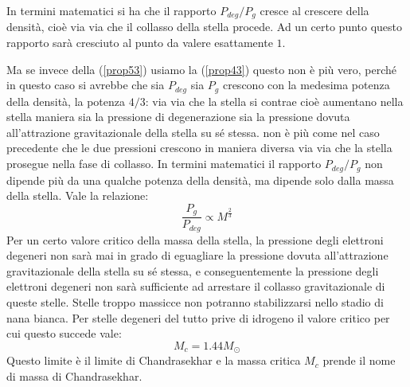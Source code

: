 In termini matematici si ha che il rapporto $P_{deg}/P_{g}$ cresce al crescere della densit\`{a}, cioè via via che il collasso della stella procede. Ad un certo punto questo rapporto sar\`{a} cresciuto al punto da valere esattamente $1$.
\par
Ma se invece della (\ref{prop53}) usiamo la (\ref{prop43}) questo non è più vero, perch\'{e} in questo caso si avrebbe che sia $P_{deg}$ sia $P_{g}$ crescono con la medesima potenza della densit\`{a}, la potenza $4/3$: via via che la stella si contrae cioè aumentano nella stella maniera sia la pressione di degenerazione sia la pressione dovuta all'attrazione gravitazionale della stella su sé stessa. non è più come nel caso precedente che le due pressioni crescono in maniera diversa via via che la stella prosegue nella fase di collasso. In termini matematici il rapporto $P_{deg}/P_{g}$ non dipende più da una qualche potenza della densit\`{a}, ma dipende solo dalla massa della stella. Vale la relazione:
\begin{equation}
\frac{P_{g}}{P_{deg}}\propto M^{\frac{2}{3}}
\end{equation}
Per un certo valore critico della massa della stella, la pressione degli elettroni degeneri non sar\`{a} mai in grado di eguagliare la pressione dovuta all'attrazione gravitazionale della stella su sé stessa, e conseguentemente la pressione degli elettroni degeneri non sar\`{a} sufficiente ad arrestare il collasso gravitazionale di queste stelle. Stelle troppo massicce non potranno stabilizzarsi nello stadio di nana bianca. Per stelle degeneri del tutto prive di idrogeno il valore critico per cui questo succede vale:
\begin{displaymath}
M_{c} =1.44 M_{\odot}
\end{displaymath}
Questo limite è il limite di Chandrasekhar e la massa critica $M_{c}$ prende il nome di massa di Chandrasekhar.
